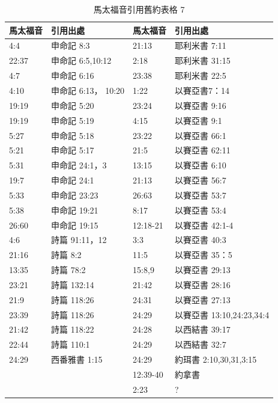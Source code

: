 \begin{table}[htbp]
  \centering

    \begin{tabular}{|p{7.215em}|p{10.645em}|p{8.645em}|p{12.285em}|}
    \toprule
    \rowcolor[rgb]{ .749,  .749,  .749} \textcolor[rgb]{ .267,  .447,  .769}{\textbf{馬太福音}} & \textcolor[rgb]{ .267,  .447,  .769}{\textbf{引用出處}} & \textcolor[rgb]{ .267,  .447,  .769}{\textbf{馬太福音}} & \textcolor[rgb]{ .267,  .447,  .769}{\textbf{引用出處}} \\
    \midrule
    4:4   & 申命記 8:3 & 21:13 & 耶利米書 7:11 \\
    \midrule
    22:37 & 申命記 6:5,10:12 & 2:18  & 耶利米書 31:15 \\
    \midrule
    4:7   & 申命記 6:16 & 23:38 & 耶利米書 22:5 \\
    \midrule
    4:10  & 申命記 6:13， 10:20 & 1:22  & 以賽亞書7：14 \\
    \midrule
    19:19 & 申命記 5:20 & 23:24 & 以賽亞書 9:16 \\
    \midrule
    19:19 & 申命記 5:19 & 4:15  & 以賽亞書 9:1 \\
    \midrule
    5:27  & 申命記 5:18 & 23:22 & 以賽亞書 66:1 \\
    \midrule
    5:21  & 申命記 5:17 & 21:5  & 以賽亞書 62:11 \\
    \midrule
    5:31  & 申命記 24:1，3 & 13:15 & 以賽亞書 6:10 \\
    \midrule
    19:7  & 申命記 24:1 & 21:13 & 以賽亞書 56:7 \\
    \midrule
    \multicolumn{1}{|l|}{5:33} & 申命記 23:23 & 26:63 & 以賽亞書 53:7 \\
    \midrule
    \multicolumn{1}{|l|}{5:38} & 申命記 19:21 & 8:17  & 以賽亞書 53:4 \\
    \midrule
    26:60 & 申命記 19:15 & 12:18-21 & 以賽亞書 42:1-4 \\
    \midrule
    4:6   & 詩篇 91:11，12 & 3:3   & 以賽亞書 40:3 \\
    \midrule
    21:16 & 詩篇 8:2 & 11:5  & 以賽亞書 35：5 \\
    \midrule
    13:35 & 詩篇 78:2 & 15:8,9 & 以賽亞書 29:13 \\
    \midrule
    23:21 & 詩篇 132:14 & 21:42 & 以賽亞書 28:16 \\
    \midrule
    21:9  & 詩篇 118:26 & 24:31 & 以賽亞書 27:13 \\
    \midrule
    23:39 & \multicolumn{1}{l|}{詩篇 118:26} & 24:29 & 以賽亞書 13:10,24:23,34:4 \\
    \midrule
    21:42 & 詩篇 118:22 & 24:28 & 以西結書 39:17 \\
    \midrule
    22:44 & 詩篇 110:1 & 24:29 & 以西結書 32:7 \\
    \midrule
    24:29 & 西番雅書 1:15 & 24:29 & 約珥書 2:10,30,31,3:15 \\
    \midrule
          &       & 12:39-40 & 約拿書  \\
    \midrule
          &       & 2:23  & ? \\
    \bottomrule
    \end{tabular}%
  \label{tab:addlabel}%
    \caption{馬太福音引用舊約表格 7} 
\end{table}%
